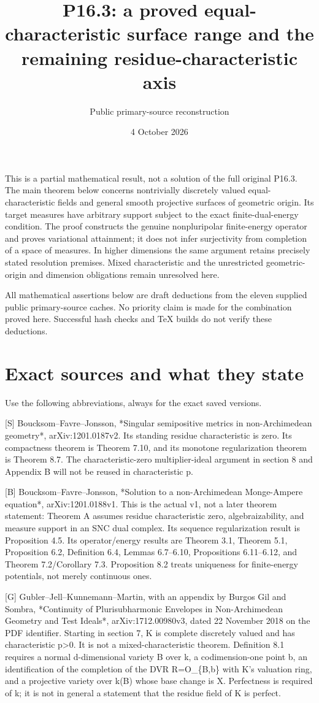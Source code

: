 \documentclass[11pt]{article}
\title{P16.3: a proved equal-characteristic surface range and the remaining residue-characteristic axis}
\author{Public primary-source reconstruction}
\date{4 October 2026}
\begin{document}
\maketitle
This is a partial mathematical result, not a solution of the full original P16.3. The main theorem below concerns nontrivially discretely valued equal-characteristic fields and general smooth projective surfaces of geometric origin. Its target measures have arbitrary support subject to the exact finite-dual-energy condition. The proof constructs the genuine nonpluripolar finite-energy operator and proves variational attainment; it does not infer surjectivity from completion of a space of measures. In higher dimensions the same argument retains precisely stated resolution premises. Mixed characteristic and the unrestricted geometric-origin and dimension obligations remain unresolved here.

All mathematical assertions below are draft deductions from the eleven supplied public primary-source caches. No priority claim is made for the combination proved here. Successful hash checks and TeX builds do not verify these deductions.

\section{Exact sources and what they state}

Use the following abbreviations, always for the exact saved versions.

[S] Boucksom--Favre--Jonsson, *Singular semipositive metrics in non-Archimedean geometry*, arXiv:1201.0187v2. Its standing residue characteristic is zero. Its compactness theorem is Theorem 7.10, and its monotone regularization theorem is Theorem 8.7. The characteristic-zero multiplier-ideal argument in section 8 and Appendix B will not be reused in characteristic p.

[B] Boucksom--Favre--Jonsson, *Solution to a non-Archimedean Monge-Ampere equation*, arXiv:1201.0188v1. This is the actual v1, not a later theorem statement: Theorem A assumes residue characteristic zero, algebraizability, and measure support in an SNC dual complex. Its sequence regularization result is Proposition 4.5. Its operator/energy results are Theorem 3.1, Theorem 5.1, Proposition 6.2, Definition 6.4, Lemmas 6.7--6.10, Propositions 6.11--6.12, and Theorem 7.2/Corollary 7.3. Proposition 8.2 treats uniqueness for finite-energy potentials, not merely continuous ones.

[G] Gubler--Jell--Kunnemann--Martin, with an appendix by Burgos Gil and Sombra, *Continuity of Plurisubharmonic Envelopes in Non-Archimedean Geometry and Test Ideals*, arXiv:1712.00980v3, dated 22 November 2018 on the PDF identifier. Starting in section 7, K is complete discretely valued and has characteristic p\textgreater{}0. It is not a mixed-characteristic theorem. Definition 8.1 requires a normal d-dimensional variety B over k, a codimension-one point b, an identification of the completion of the DVR R=O\_\{B,b\} with K's valuation ring, and a projective variety over k(B) whose base change is X. Perfectness is required of k; it is not in general a statement that the residue field of K is perfect.
\end{document}
